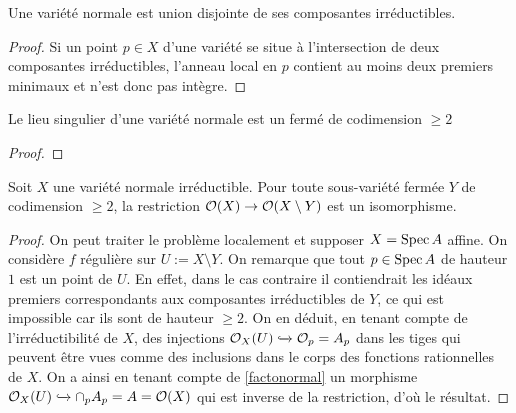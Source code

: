 \begin{prop}\label{normaluniondisjointe}
Une variété normale est union disjointe de ses composantes irréductibles.
\end{prop}
\begin{proof}
Si un point $p\in X$ d'une variété se situe à l'intersection de deux composantes irréductibles, l'anneau local en $p$ contient au moins deux premiers minimaux et n'est donc pas intègre.
\end{proof}

\begin{prop}\label{codimesingnormal}
Le lieu singulier d'une variété normale est un fermé de codimension $\geq 2$
\end{prop}
\begin{proof}

\end{proof}


\begin{prop}\label{extregularnormal}
Soit $X$ une variété normale irréductible. Pour toute sous-variété fermée $Y$ de codimension $\geq 2$, la restriction $\mathcal{O}(X)\rightarrow \mathcal{O}(X\setminus Y)$ est un isomorphisme.
\end{prop}
\begin{proof}
On peut traiter le problème localement et supposer $X=\operatorname{Spec} A$ affine. On considère $f$ régulière sur $U:=X\setminus Y$. On remarque que tout $p\in \operatorname{Spec} A$ de hauteur $1$ est un point de $U$. En effet, dans le cas contraire il contiendrait les idéaux premiers correspondants aux composantes irréductibles de $Y$, ce qui est impossible car ils sont de hauteur $\geq 2$. On en déduit, en tenant compte de l'irréductibilité de $X$, des injections $\mathcal{O}_X(U)\xhookrightarrow{} \mathcal{O}_p=A_p$ dans les tiges qui peuvent être vues comme des inclusions dans le corps des fonctions rationnelles de $X$. On a ainsi en tenant compte de \ref{factonormal} un morphisme $\mathcal{O}_X(U)\xhookrightarrow{} \cap_p A_p=A=\mathcal{O}(X)$ qui est inverse de la restriction, d'où le résultat.
\end{proof}

